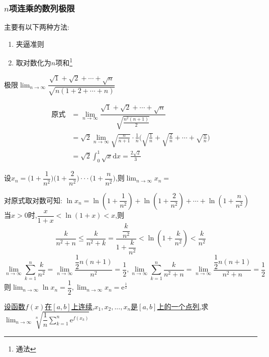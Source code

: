 \documentclass[8pt a4paper, oneside, UTF8]{ctexbook}
\begin{document}
\begin{sloppypar}
    \subsubsection{$n$项连乘的数列极限}
    主要有以下两种方法:
    \begin{enumerate}
        \item 夹逼准则
        \item 取对数化为$n$项和\footnote{通法}
    \end{enumerate}
    \begin{problem}
        极限$\lim_{n\to\infty}\dfrac{\sqrt{1}+\sqrt{2}+\cdots+\sqrt{n}}{\sqrt{n(1+2+\cdots+n)}}$        
    \end{problem}
    \begin{solution}
        \begin{align*}
          \text{原式} & = \lim_{n\to\infty}\dfrac{\sqrt{1}+\sqrt{2}+\cdots+\sqrt{n}}{\sqrt{\frac{n^2(n+1)}2}} \\
          & = \sqrt{2}\lim_{n\to\infty}\sqrt{\frac n{n+1}}\cdot\frac1n\Big(\sqrt{\frac1n}+\sqrt{\frac2n}+\cdots+\sqrt{\frac nn}\Big)\\
          & = \sqrt{2}\int_0^1\sqrt{x}\mathrm{d}x=\frac{2\sqrt{2}}{3}
        \end{align*}
    \end{solution}
    \begin{problem}
        设$x_n=\Bigg(1+\dfrac{1}{n^2}\Bigg)\Bigg(1+\dfrac{2}{n^2}\Bigg)\cdotp\cdotp\cdotp\Bigg(1+\dfrac{n}{n^2}\Bigg)$,则$\lim_{n\to\infty}x_n=$
    \end{problem}
    \begin{solution}
        对原式取对数可知:
        $\ln x_n=\ln(1+\dfrac{1}{n^2})+\ln(1+\dfrac{2}{n^2})+\cdots +\ln(1+\dfrac{n}{n^2})$
        当$x>0$时,$\dfrac x{1+x}<\ln(1+x)<x$,则
        $$
        \dfrac k{n^2+n}\leqslant\dfrac k{n^2+k}=\dfrac{\dfrac k{n^2}}{1+\dfrac k{n^2}}<\ln\left(1+\dfrac k{n^2}\right)<\dfrac k{n^2}
        $$
        $$
        \lim_{n\to\infty}\sum_{k=1}^n\dfrac k{n^2}=\lim_{n\to\infty}\dfrac{\dfrac12n(n+1)}{n^2}=\dfrac12,\lim_{n\to\infty}\sum_{k=1}^n\dfrac k{n^2+n}=\lim_{n\to\infty}\dfrac{\dfrac12n(n+1)}{n^2+n}=\dfrac12
        $$
        则$\lim_{n\to\infty}\ln x_{n} = \dfrac{1}{2},\lim_{n\to\infty}x_{n} = \mathrm{e}^{\frac{1}{2}}$
    \end{solution}
    \begin{problem}
        \uline{设函数$f(x)$在$[a,b]$上连续,$x_1,x_2,...,x_n$是$[a,b]$上的一个点列,}求$\lim_{n\to\infty}\sqrt[n]{\dfrac1n\sum_{k=1}^n\mathrm{e}^{f(x_k)}}$

\end{problem}
\end{sloppypar}
\end{document}
